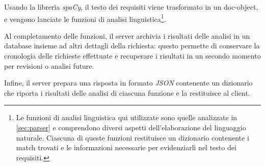 \documentclass[12pt]{report}
\newcommand{\spacy}{\textsl{spaCy}\xspace}
\newcommand{\json}{\textsl{JSON}\xspace}
\begin{document}
Usando la libreria \spacy, il testo dei requisiti viene trasformato in un doc-object, e vengono lanciate le funzioni di analisi linguistica\footnote{Le funzioni di analisi linguistica qui utilizzate sono quelle analizzate in \cref{sec:parser} e comprendono diversi aspetti dell'elaborazione del linguaggio naturale. Ciascuna di queste funzioni restituisce un dizionario contenente i match trovati e le informazioni necessarie per evidenziarli nel testo dei requisiti.}.

Al completamento delle funzioni, il server archivia i risultati delle analisi in un database insieme ad altri dettagli della richiesta: questo permette di conservare la cronologia delle richieste effettuate e recuperare i risultati in un secondo momento per revisioni o analisi future.

Infine, il server prepara una risposta in formato \json contenente un dizionario che riporta i risultati delle analisi di ciascuna funzione e la restituisce al client.
\end{document}
